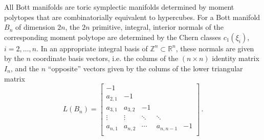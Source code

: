 \documentclass[a4paper,11pt,reqno]{amsart}
\newcommand{\R}{\mathbb R}
\newcommand{\Z}{\mathbb Z}
\begin{document}
All Bott manifolds are toric symplectic manifolds determined by moment polytopes that are combinatorially equivalent to
hypercubes. For a Bott manifold $B_n$ of dimension $2n$, the $2n$ primitive, integral, interior normals of the corresponding
moment polytope are determined by the Chern classes $c_1(\xi_i)$, $i=2, \ldots, n$. In an appropriate integral basis of 
$\Z^n \subset \R^n$, these normals are given by the $n$ coordinate basis vectors, i.e. the colums of the $(n\times n)$ 
identity matrix $I_n$, and the $n$ ``opposite'' vectors given by the colums of the lower triangular matrix
\[
L(B_n) = 
\begin{bmatrix}
-1 & \  & \  & \  & \  \\
a_{2,1} & -1  & \  & \  & \  \\
a_{3,1}  & a_{3,2}  & -1  & \  & \  \\
\vdots  & \vdots   & \ddots   & \ddots  & \  \\ 
a_{n,1}  & a_{n,2}  & \cdots  & a_{n,n-1}  & -1 \\
\end{bmatrix} \,.
\]
\end{document}
